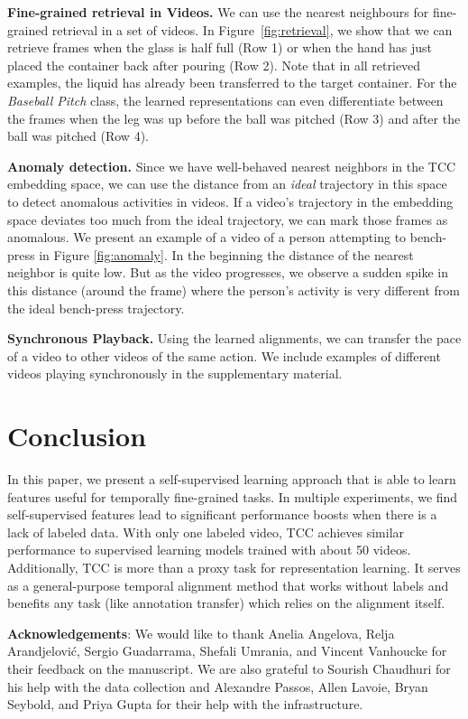 \documentclass[10pt,twocolumn,letterpaper]{article}
\begin{document}
    \noindent\textbf{Fine-grained retrieval in Videos.} We can use the nearest neighbours for fine-grained retrieval in a set of videos. In Figure~\ref{fig:retrieval}, we show that we can retrieve frames when the glass is half full (Row 1) or when the hand has just placed the container back after pouring (Row 2). Note that in all retrieved examples, the liquid has already been transferred to the target container. For the \textit{Baseball Pitch} class, the learned representations can even differentiate between the frames when the leg was up before the ball was pitched (Row 3) and after the ball was pitched (Row 4). 

    \noindent\textbf{Anomaly detection.} Since we have well-behaved nearest neighbors in the TCC embedding space, we can use the distance from an \textit{ideal} trajectory in this space to detect anomalous activities in videos. If a video's trajectory in the embedding space deviates too much from the ideal trajectory, we can mark those frames as anomalous. We present an example of a video of a person attempting to bench-press in Figure \ref{fig:anomaly}. In the beginning the distance of the nearest neighbor is quite low. But as the video progresses, we observe a sudden spike in this distance (around the  frame) where the person's activity is very different from the ideal bench-press trajectory.
    

\noindent\textbf{Synchronous Playback.} Using the learned alignments, we can transfer the pace of a video to other videos of the same action. We include examples of different videos playing synchronously in the supplementary material.
     \section{Conclusion}

In this paper, we present a self-supervised learning approach that is able to learn features useful for temporally fine-grained tasks. In multiple experiments, we find self-supervised features lead to significant performance boosts when there is a lack of labeled data. With only one labeled video, TCC achieves similar performance to supervised learning models trained with about 50 videos. Additionally, TCC is more than a proxy task for representation learning. It serves as a general-purpose temporal alignment method that works without labels and benefits any task (like annotation transfer) which relies on the alignment itself.


\small{
\textbf{Acknowledgements}: We would like to thank Anelia Angelova, Relja Arandjelovi\'c, Sergio Guadarrama, Shefali Umrania, and Vincent Vanhoucke for their feedback on the manuscript. We are also grateful to Sourish Chaudhuri for his help with the data collection and Alexandre Passos, Allen Lavoie, Bryan Seybold, and Priya Gupta for their help with the infrastructure.
}
 
\end{document}
